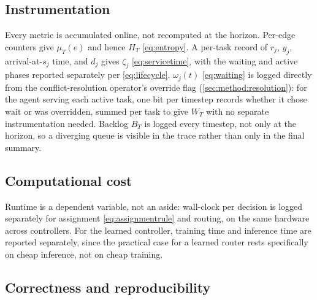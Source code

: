 \documentclass[../main.tex]{subfiles}
\begin{document}
\subsection{Instrumentation}
\label{sec:impl:logging}

Every metric is accumulated online, not recomputed at the horizon. Per-edge
counters give $\mu_T(e)$ and hence $H_T$ \eqref{eq:entropy}. A per-task record
of $r_j$, $y_j$, arrival-at-$s_j$ time, and $d_j$ gives $\zeta_j$
\eqref{eq:servicetime}, with the waiting and active phases reported
separately per \eqref{eq:lifecycle}. $\omega_j(t)$ \eqref{eq:waiting} is
logged directly from the conflict-resolution operator's override flag
(\ref{sec:method:resolution}): for the agent serving each active task, one bit
per timestep records whether it chose $\mathrm{wait}$ or was overridden,
summed per task to give $W_T$ with no separate instrumentation needed. Backlog
$B_T$ is logged every timestep, not only at the horizon, so a diverging queue
is visible in the trace rather than only in the final summary.

\subsection{Computational cost}
\label{sec:impl:cost}

Runtime is a dependent variable, not an aside: wall-clock per decision is
logged separately for assignment \eqref{eq:assignmentrule} and routing, on
the same hardware across controllers. For the learned controller, training
time and inference time are reported separately, since the practical case for
a learned router rests specifically on cheap inference, not on cheap training.

\subsection{Correctness and reproducibility}
\label{sec:impl:validation}
\end{document}
